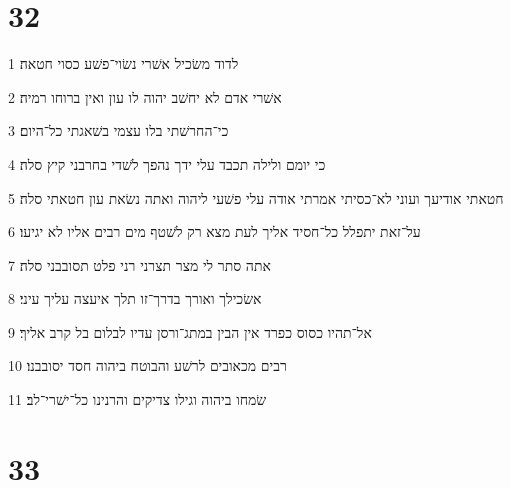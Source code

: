 \chapter{32}

\par 1 לדוד משׂכיל אשׁרי נשׂוי־פשׁע כסוי חטאה׃
\par 2 אשׁרי אדם לא יחשׁב יהוה לו עון ואין ברוחו רמיה׃
\par 3 כי־החרשׁתי בלו עצמי בשׁאגתי כל־היום׃
\par 4 כי יומם ולילה תכבד עלי ידך נהפך לשׁדי בחרבני קיץ סלה׃
\par 5 חטאתי אודיעך ועוני לא־כסיתי אמרתי אודה עלי פשׁעי ליהוה ואתה נשׂאת עון חטאתי סלה׃
\par 6 על־זאת יתפלל כל־חסיד אליך לעת מצא רק לשׁטף מים רבים אליו לא יגיעו׃
\par 7 אתה סתר לי מצר תצרני רני פלט תסובבני סלה׃
\par 8 אשׂכילך ואורך בדרך־זו תלך איעצה עליך עיני׃
\par 9 אל־תהיו כסוס כפרד אין הבין במתג־ורסן עדיו לבלום בל קרב אליך׃
\par 10 רבים מכאובים לרשׁע והבוטח ביהוה חסד יסובבנו׃
\par 11 שׂמחו ביהוה וגילו צדיקים והרנינו כל־ישׁרי־לב׃

\chapter{33}

